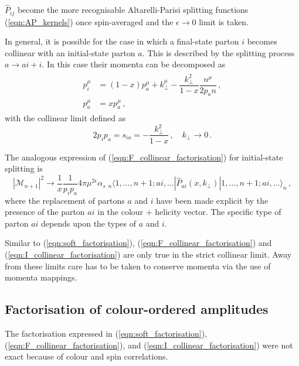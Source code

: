 \documentclass[main.tex]{subfiles}
\begin{document}
    $\hat{P}_{ij}$ become the more recognisable Altarelli-Parisi
    splitting functions (\ref{eqn:AP_kernels}) once spin-averaged
    and the $\epsilon \rightarrow 0$ limit is taken.

    In general, it is possible for the case in which a final-state
    parton $i$ becomes collinear with an initial-state parton $a$.
    This is described by the splitting process $a \rightarrow ai + i$.
    In this case their momenta can be decomposed as
    \begin{align}\label{eqn:I_collinear_momenta}
        \begin{split}
        p_{i}^{\mu} &= (1-x)p_{a}^{\mu} + k_{\perp}^{\mu} - \dfrac{k_{\perp}^{2}}{1-x}\dfrac{n^{\mu}}{2p_{a} n} \, , \\
        p_{a}^{\mu} &= x p_{a}^{\mu} \, ,
        \end{split}
    \end{align}
    with the collinear limit defined as
    \begin{equation}\label{eqn:I_collinear_limit}
        2p_{i}p_{a} = s_{ia} = -\dfrac{k_{\perp}^{2}}{1-x} \, , \quad k_{\perp} \rightarrow 0 \, .
    \end{equation}

    The analogous expression of (\ref{eqn:F_collinear_factorisation})
    for initial-state splitting is
    \begin{equation}\label{eqn:I_collinear_factorisation}
        |\mathcal{M}_{n+1}|^{2} \rightarrow \dfrac{1}{x} \dfrac{1}{p_{i}p_{a}} 4\pi \mu^{2\epsilon} \alpha_{s} \; {}_{n} \langle 1,\ldots,n+1;ai, \ldots | \hat{P}_{ai}(x, k_{\perp}) | 1,\ldots,n+1;ai,\ldots \rangle_{n} \, ,
    \end{equation}
    where the replacement of partons $a$ and $i$ have been made
    explicit by the presence of the parton $ai$ in the colour + helicity vector.
    The specific type of parton $ai$ depends upon the types of $a$ and $i$.

    Similar to (\ref{eqn:soft_factorisation}), (\ref{eqn:F_collinear_factorisation})
     and (\ref{eqn:I_collinear_factorisation}) are only
    true in the strict collinear limit. Away from these
    limits care has to be taken to conserve momenta
    via the use of momenta mappings.

\subsection{Factorisation of colour-ordered amplitudes}\label{sec:CO_factorisation}
    The factorisation expressed in (\ref{eqn:soft_factorisation}),
    (\ref{eqn:F_collinear_factorisation}), and (\ref{eqn:I_collinear_factorisation})
    were not exact because of colour and spin correlations.
\end{document}
